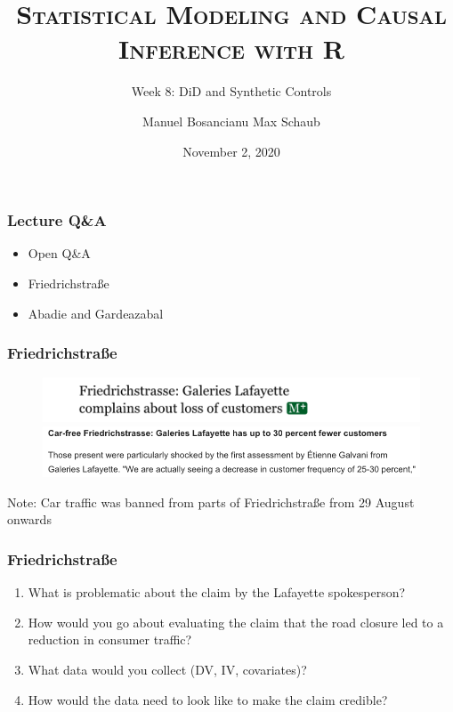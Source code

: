 \documentclass[12pt,english,dvipsnames,aspectratio=169,handout]{beamer}\usepackage[]{graphicx}\usepackage[]{xcolor}
\title{\textsc{Statistical Modeling and Causal Inference with R}}
\subtitle{Week 8: DiD and Synthetic Controls}
\date{November 2, 2020}
\author{Manuel Bosancianu \hfill Max Schaub}
\institute{Hertie School of Governance}
\begin{document}
\maketitle



\begin{frame}
	\frametitle{Lecture Q\&A}
	\begin{itemize} \large
		\item Open Q\&A 
		\item Friedrichstra{\ss}e
		\item Abadie and Gardeazabal \citeyear{abadie_economic_2003}
	\end{itemize}
\end{frame}


\begin{frame}
	\frametitle{Friedrichstra{\ss}e}
  	 \begin{figure} 
    \includegraphics[height=0.11\textwidth,keepaspectratio=true]{../04-figures/08/10-lafayette1}
    \includegraphics[height=0.125\textwidth,keepaspectratio=true]{../04-figures/08/11-lafayette2}
    \end{figure} \scriptsize
    Note: Car traffic was banned from parts of Friedrichstra{\ss}e from 29 August onwards
\end{frame}


\begin{frame}
	\frametitle{Friedrichstra{\ss}e}
	\begin{enumerate}
		\item What is problematic about the claim by the Lafayette spokesperson? 
		\item How would you go about evaluating the claim that the road closure led to a reduction in consumer traffic?
		\item What data would you collect (DV, IV, covariates)?
		\item How would the data need to look like to make the claim credible?
	\end{enumerate}
\end{frame}
\end{document}

